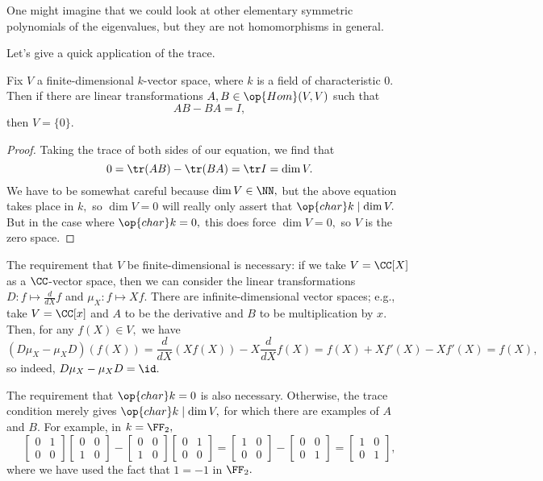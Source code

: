 \begin{remark}
	One might imagine that we could look at other elementary symmetric polynomials of the eigenvalues, but they are not homomorphisms in general.
\end{remark}
Let's give a quick application of the trace.
\begin{theorem}
	Fix $V$ a finite-dimensional $k$-vector space, where $k$ is a field of characteristic $0.$ Then if there are linear transformations $A,B\in\op{Hom}(V,V)$ such that
	\[AB-BA=I,\]
	then $V=\{0\}.$
\end{theorem}
\begin{proof}
	Taking the trace of both sides of our equation, we find that
	\[0=\tr (AB)-\tr (BA)=\tr I=\dim V.\]
	We have to be somewhat careful because $\dim V\in\NN,$ but the above equation takes place in $k,$ so $\dim V=0$ will really only assert that $\op{char}k\mid\dim V.$ But in the case where $\op{char}k=0,$ this does force $\dim V=0,$ so $V$ is the zero space.
\end{proof}
\begin{example}
	The requirement that $V$ be finite-dimensional is necessary: if we take $V=\CC[X]$ as a $\CC$-vector space, then we can consider the linear transformations $D:f\mapsto\frac d{dX}f$ and $\mu_X:f\mapsto Xf.$ There are infinite-dimensional vector spaces; e.g., take $V=\CC[x]$ and $A$ to be the derivative and $B$ to be multiplication by $x.$ Then, for any $f(X)\in V,$ we have
	\[(D\mu_X-\mu_XD)(f(X))=\frac d{dX}(Xf(X))-X\frac d{dX}f(X)=f(X)+Xf'(X)-Xf'(X)=f(X),\]
	so indeed, $D\mu_X-\mu_XD=\id.$
\end{example}
\begin{example}[Nir]
	The requirement that $\op{char}k=0$ is also necessary. Otherwise, the trace condition merely gives $\op{char}k\mid\dim V,$ for which there are examples of $A$ and $B.$ For example, in $k=\FF_2,$
	\[\begin{bmatrix}
		0 & 1 \\
		0 & 0
	\end{bmatrix}\begin{bmatrix}
		0 & 0 \\
		1 & 0
	\end{bmatrix}-\begin{bmatrix}
		0 & 0 \\
		1 & 0
	\end{bmatrix}\begin{bmatrix}
		0 & 1 \\
		0 & 0
	\end{bmatrix}=\begin{bmatrix}
		1 & 0 \\
		0 & 0
	\end{bmatrix}-\begin{bmatrix}
		0 & 0 \\
		0 & 1
	\end{bmatrix}=\begin{bmatrix}
		1 & 0 \\
		0 & 1
	\end{bmatrix},\]
	where we have used the fact that $1=-1$ in $\FF_2.$
\end{example}
